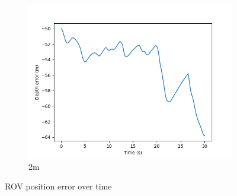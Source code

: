 \documentclass[class=article, crop=false]{standalone}
\begin{document}
\begin{figure}
\begin{subfigure}[b]{0.48\textwidth}
        \includegraphics{scenario1/rov-50m/2.0m/rov_depth_error_controlled}
        \caption{2m}
        \label{}
    \end{subfigure}

    \caption{ROV position error over time}
\end{figure}
\end{document}
